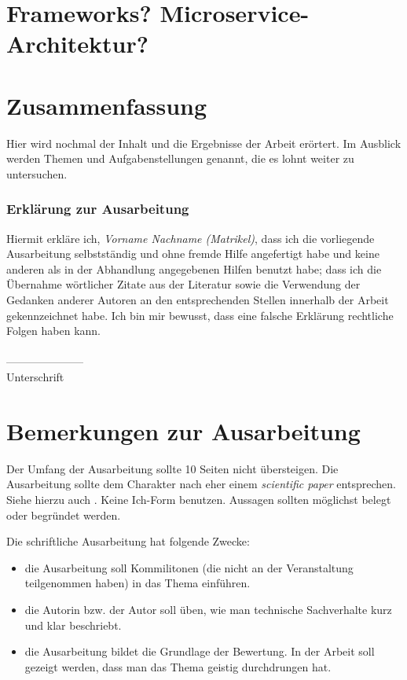 \documentclass[fleqn,10pt,ngerman]{SelfArx}
\begin{document}
\section{Frameworks? Microservice-Architektur?}

\section{Zusammenfassung}
Hier wird nochmal der Inhalt und die Ergebnisse der Arbeit erörtert. Im Ausblick werden Themen und Aufgabenstellungen genannt, die es lohnt weiter zu untersuchen.






\subsubsection*{Erklärung zur Ausarbeitung}
Hiermit erkläre ich, {\it Vorname Nachname (Matrikel)}, dass ich die vorliegende Ausarbeitung selbstständig und ohne fremde Hilfe angefertigt habe und keine anderen als in der Abhandlung angegebenen Hilfen benutzt habe; dass ich die Übernahme wörtlicher Zitate aus der Literatur sowie die Verwendung der Gedanken anderer Autoren an den entsprechenden Stellen innerhalb der Arbeit gekennzeichnet habe. Ich bin mir bewusst, dass eine falsche Erklärung rechtliche Folgen haben kann.\\ \\
--------------------- \\
Unterschrift


\clearpage
\newpage
\appendix
\section{Bemerkungen zur Ausarbeitung}
Der Umfang der Ausarbeitung sollte 10 Seiten nicht übersteigen. Die Ausarbeitung sollte dem Charakter nach eher einem {\it scientific paper} entsprechen. Siehe hierzu auch  \cite{Rechenberg}. Keine Ich-Form benutzen. Aussagen sollten möglichst belegt oder begründet werden.

Die schriftliche Ausarbeitung hat folgende Zwecke:
\begin{itemize}[noitemsep]
\item die Ausarbeitung soll Kommilitonen (die nicht an der Veranstaltung teilgenommen haben) in das Thema ein\-führen.
\item die Autorin bzw. der Autor soll üben, wie man technische Sachverhalte kurz und klar beschriebt.
\item die Ausarbeitung bildet die Grundlage der Bewertung. In der Arbeit soll
gezeigt werden, dass man das Thema geistig durchdrungen hat.
\end{itemize}
\end{document}

